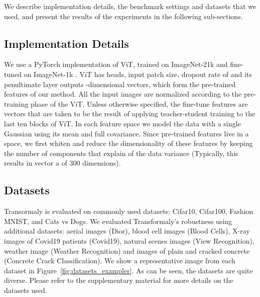 \documentclass[10pt,twocolumn,letterpaper]{article}
\begin{document}
We describe implementation details, the benchmark settings and datasets that we used, and present the results of the experiments in the following sub-sections. 


\subsection{Implementation Details}
We use a PyTorch implementation of ViT, trained on ImageNet-21k and fine-tuned on ImageNet-1k \cite{melas-kyriazi_vit_2021, ridnik2021imagenet}. ViT has  heads,  input patch size, dropout rate of  and its penultimate layer outputs -dimensional vectors, which form the pre-trained features of our method. All the input images are normalized according to the pre-training phase of the ViT. Unless otherwise specified, the fine-tune features are  vectors that are taken to be the result of applying teacher-student training to the last ten blocks of ViT. In each feature space we model the data with a single Gaussian using its mean and full covariance. Since pre-trained features live in a  space, we first whiten and reduce the dimensionality of these features by keeping the number of components that explain  of the data variance (Typically, this results in vector a of 300 dimensions).








\subsection{Datasets}




Transormaly is evaluated on commonly used datasets: Cifar10, Cifar100, Fashion MNIST, and Cats vs Dogs. We evaluated Transformaly's robustness using additional datasets: aerial images (Dior), blood cell images (Blood Cells), X-ray images of Covid19 patients (Covid19), natural scenes images (View Recognition), weather image (Weather Recognition) and images of plain and cracked concrete (Concrete Crack Classification). We show a representative image from each dataset in Figure~\ref{fig:datasets_exampler}. As can be seen, the datasets are quite diverse. Please refer to the supplementary material for more details on the datasets used.
\end{document}
